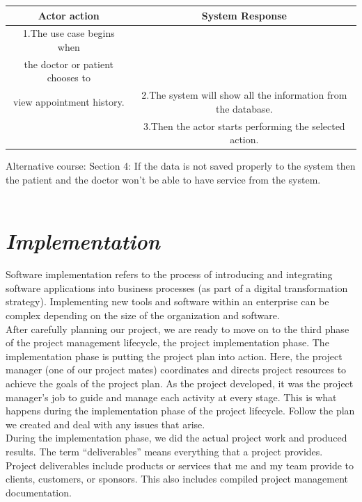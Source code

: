 \documentclass[14pt,a4paper,calibribody]{article}
\begin{document}
\begin{center}
\begin{tabular}{ |c| c |}
\hline
Actor action & System Response \\ 
\hline
1.The use case begins when\\the doctor or patient chooses to\\view appointment history. & 2.The system will show all the information from the database.\\ 
\hline
& 3.Then the actor starts performing the selected action.\\ 
\hline
\end{tabular}
\end{center}
Alternative course:
Section 4: If the data is not saved properly to the system then the patient and the doctor won’t be able to have service from the system.\\\\
\clearpage
\section{\emph{\large{Implementation}}}
Software implementation refers to the process of introducing and integrating software applications into business processes (as part of a digital transformation strategy). Implementing new tools and software within an enterprise can be complex depending on the size of the organization and software.\\

After carefully planning our project, we are ready to move on to the third phase of the project management lifecycle, the project implementation phase. The implementation phase is putting the project plan into action. Here, the project manager (one of our project mates) coordinates and directs project resources to achieve the goals of the project plan. As the project developed, it was the project manager's job to guide and manage each activity at every stage. This is what happens during the implementation phase of the project lifecycle. Follow the plan we created and deal with any issues that arise.\\

During the implementation phase, we did the actual project work and produced results. The term “deliverables” means everything that a project provides. Project deliverables include products or services that me and my team provide to clients, customers, or sponsors. This also includes compiled project management documentation.\\
\end{document}
